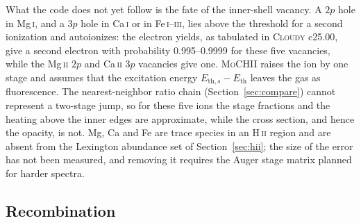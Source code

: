 \documentclass[twocolumn,linenumbers]{aastex702}
\newcommand{\MoCHII}{\textsc{MoCHII}}
\newcommand{\HII}{H\,\textsc{ii}}
\begin{document}
What the code does not yet follow is the fate of the inner-shell vacancy.
A $2p$ hole in Mg\,\textsc{i}, and a $3p$ hole in Ca\,\textsc{i} or in
Fe\,\textsc{i}--\textsc{iii}, lies above the threshold for a second
ionization and autoionizes: the \citet{kaastra1993} electron yields, as
tabulated in \textsc{Cloudy} c25.00, give a second electron with
probability 0.995--0.9999 for these five vacancies, while the
Mg\,\textsc{ii} $2p$ and Ca\,\textsc{ii} $3p$ vacancies give one.
\MoCHII{} raises the ion by one stage and assumes that the excitation
energy $E_{\mathrm{th},s} - E_{\mathrm{th}}$ leaves the gas as fluorescence.
The nearest-neighbor ratio chain (Section~\ref{sec:compare}) cannot
represent a two-stage jump, so for these five ions the stage fractions and
the heating above the inner edges are approximate, while the cross section,
and hence the opacity, is not.  Mg, Ca and Fe are trace species in an
\HII{} region and are absent from the Lexington abundance set of
Section~\ref{sec:hii}; the size of the error has not been measured, and
removing it requires the Auger stage matrix planned for harder spectra.

\subsection{Recombination}
\label{sec:recomb}
\end{document}

